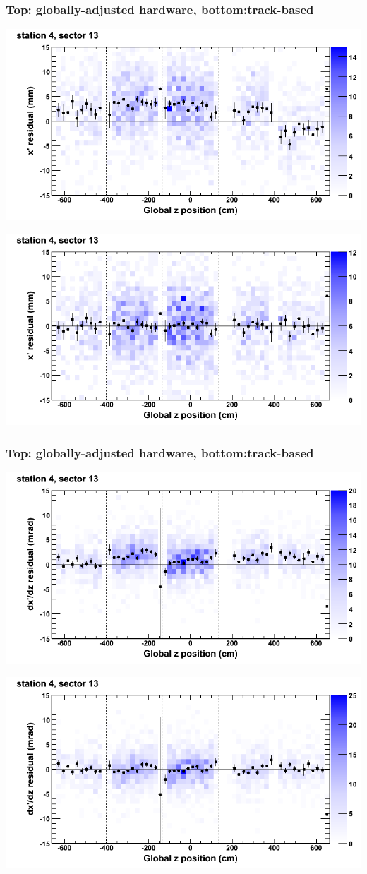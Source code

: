 \documentclass[compress]{beamer}
\begin{document}
\begin{frame}
\frametitle{Top: globally-adjusted hardware, bottom:track-based}
\includegraphics[width=0.7\linewidth]{NOV4_mapplots_HW/DTvsz_st4sec13_x.png}

\includegraphics[width=0.7\linewidth]{NOV4_mapplots/DTvsz_st4sec13_x.png}
\end{frame}

\begin{frame}
\frametitle{Top: globally-adjusted hardware, bottom:track-based}
\includegraphics[width=0.7\linewidth]{NOV4_mapplots_HW/DTvsz_st4sec13_dxdz.png}

\includegraphics[width=0.7\linewidth]{NOV4_mapplots/DTvsz_st4sec13_dxdz.png}
\end{frame}
\end{document}
